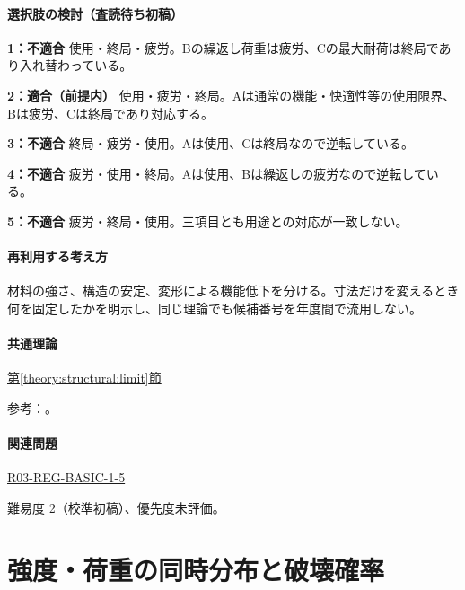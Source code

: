 \paragraph{選択肢の検討（査読待ち初稿）}\mbox{}\par

\noindent\textbf{1：不適合} 使用・終局・疲労。Bの繰返し荷重は疲労、Cの最大耐荷は終局であり入れ替わっている。\par

\noindent\textbf{2：適合（前提内）} 使用・疲労・終局。Aは通常の機能・快適性等の使用限界、Bは疲労、Cは終局であり対応する。\par

\noindent\textbf{3：不適合} 終局・疲労・使用。Aは使用、Cは終局なので逆転している。\par

\noindent\textbf{4：不適合} 疲労・使用・終局。Aは使用、Bは繰返しの疲労なので逆転している。\par

\noindent\textbf{5：不適合} 疲労・終局・使用。三項目とも用途との対応が一致しない。\par

\paragraph{再利用する考え方} 材料の強さ、構造の安定、変形による機能低下を分ける。寸法だけを変えるとき何を固定したかを明示し、同じ理論でも候補番号を年度間で流用しない。

\paragraph{共通理論} \hyperref[theory:structural:limit]{第\ref*{theory:structural:limit}節}

\par 参考：\cite{struct_mlit_limit}。

\paragraph{関連問題} \hyperref[q:r03-reg-basic-1-5]{R03-REG-BASIC-1-5}

\par 難易度 2（校準初稿）、優先度未評価。

\section{強度・荷重の同時分布と破壊確率}

